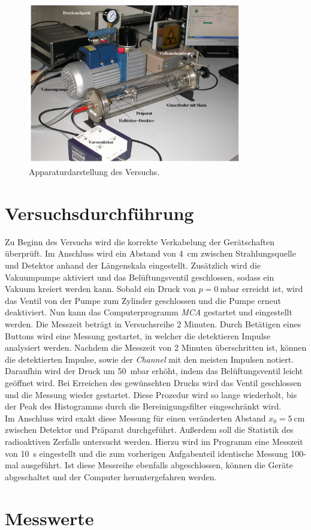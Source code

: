 \begin{figure}[H]
    \centering
    \includegraphics[height=7cm]{content/Aufbau.png}
    \caption{Apparaturdarstellung des Versuchs\cite{Versuchsanleitung_v701}.}
    \label{fig:Aufbau}
\end{figure}

\section{Versuchsdurchführung}
\label{sec:Versuchsdurchführung}

Zu Beginn des Versuchs wird die korrekte Verkabelung der Gerätschaften überprüft. Im Anschluss wird ein Abstand von \qty{4}{\centi\meter} zwischen 
Strahlungsquelle und Detektor anhand der Längenskala eingestellt. Zusätzlich wird die Vakuumpumpe aktiviert und das Belüftungsventil geschlossen, 
sodass ein Vakuum kreiert werden kann. Sobald ein Druck von $p = \qty{0}{\milli\bar}$ erreicht ist, wird das Ventil von der Pumpe zum Zylinder 
geschlossen und die Pumpe erneut deaktiviert. Nun kann das Computerprogramm \emph{MCA} gestartet und eingestellt werden. Die Messzeit beträgt in 
Versuchsreihe 2 Minuten. Durch Betätigen eines Buttons wird eine Messung gestartet, in welcher die detektieren Impulse analysiert werden. Nachdem 
die Messzeit von 2 Minuten überschritten ist, können die detektierten Impulse, sowie der \emph{Channel} mit den meisten Impulsen notiert. Daraufhin 
wird der Druck um \qty{50}{\milli\bar} erhöht, indem das Belüftungsventil leicht geöffnet wird. Bei Erreichen des gewünschten Drucks wird das Ventil
geschlossen und die Messung wieder gestartet. Diese Prozedur wird so lange wiederholt, bis der Peak des Histogramms durch die Bereinigungsfilter 
eingeschränkt wird.\\

\noindent Im Anschluss wird exakt diese Messung für einen veränderten Abstand $x_0 = \qty{5}{\centi\meter}$ zwischen Detektor und Präparat durchgeführt.
Außerdem soll die Statistik des radioaktiven Zerfalls untersucht werden. Hierzu wird im Programm eine Messzeit von \qty{10}{\second} eingestellt 
und die zum vorherigen Aufgabenteil identische Messung 100-mal ausgeführt. Ist diese Messreihe ebenfalls abgeschlossen, können die Geräte abgeschaltet
und der Computer heruntergefahren werden.   

\section{Messwerte}
\label{sec:Messwerte}

%


